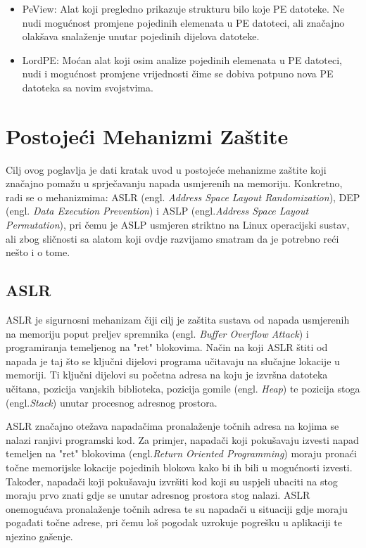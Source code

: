 \documentclass[times, utf8, diplomski, numeric]{fer}
\begin{document}
\begin{itemize}
\item PeView: Alat koji pregledno prikazuje strukturu bilo koje			%
PE datoteke. Ne nudi mogućnost promjene pojedinih elemenata u PE
datoteci, ali značajno olakšava snalaženje unutar pojedinih
dijelova datoteke.

\item LordPE: Moćan alat koji osim analize pojedinih elemenata u		%
PE datoteci, nudi i mogućnost promjene vrijednosti čime se dobiva
potpuno nova PE datoteka sa novim svojstvima.

\end{itemize}

\chapter{Postojeći Mehanizmi Zaštite}

Cilj ovog poglavlja je dati kratak uvod u postojeće mehanizme
zaštite koji značajno pomažu u sprječavanju napada usmjerenih na		%
memoriju. Konkretno, radi se o mehanizmima: ASLR (engl.
\emph{Address Space Layout Randomization}), DEP (engl. \emph{Data
Execution Prevention}) i ASLP (engl.\emph{Address Space Layout
Permutation}), pri čemu je ASLP usmjeren striktno na Linux
operacijski sustav, ali zbog sličnosti sa alatom koji ovdje
razvijamo smatram da je potrebno reći nešto i o tome. 

\section{ASLR}
\label{sct:aslr}

ASLR je sigurnosni mehanizam čiji cilj je zaštita sustava od
napada usmjerenih na memoriju poput preljev spremnika (engl.
\emph{Buffer Overflow Attack}) i programiranja temeljenog na
"ret" blokovima. Način na koji ASLR štiti od napada je taj što se
ključni dijelovi programa učitavaju na slučajne lokacije u
memoriji. Ti ključni dijelovi su početna adresa na koju je
izvršna datoteka učitana, pozicija vanjskih biblioteka, pozicija
gomile (engl. \emph{Heap}) te pozicija stoga (engl.\emph{Stack})		%
unutar procesnog adresnog prostora.

ASLR značajno otežava napadačima pronalaženje točnih adresa na
kojima se nalazi ranjivi programski kod. Za primjer, napadači
koji pokušavaju izvesti napad temeljen na "ret" blokovima
(engl.\emph{Return Oriented Programming})\citep{rop_official}
moraju pronaći točne memorijske lokacije pojedinih blokova kako
bi ih bili u mogućnosti izvesti. Također, napadači koji
pokušavaju izvršiti kod koji su uspjeli ubaciti na stog moraju
prvo znati gdje se unutar adresnog prostora stog nalazi. ASLR
onemogućava pronalaženje točnih adresa te su napadači u situaciji
gdje moraju pogađati točne adrese, pri čemu loš pogodak uzrokuje
pogrešku u aplikaciji te njezino gašenje.
\end{document}
